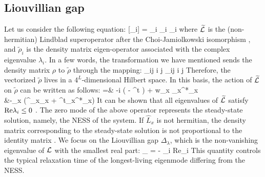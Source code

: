 \subsection{Liouvillian gap}
\label{subsec_liouvilliangap}

Let us consider the following equation:
	[\widetilde \rho_i] = \lambda_i \widetilde \rho_i \cm
	\qquad \lambda_i \in {} \pc
\ea
where $\widetilde {\cal L}$ is the (non-hermitian) Lindblad superoperator after the 
Choi-Jamiolkowski isomorphism 
\cite{BP-openquantumsystembook, VZ-2004-superoperatorvidal}, and $\widetilde \rho_i$ is the
density matrix eigen-operator associated with the complex eigenvalue $\lambda_i$.
In a few words, the transformation we have mentioned sends the density matrix $\rho$ to 
$\widetilde \rho$ through the mapping:
	\rho_{ij} \ket i \bra j  \longrightarrow  \widetilde \rho_{ij} \ket i \ket j \pt
\ee
Therefore, the vectorized $\widetilde \rho$ lives in a $4^L$-dimensional Hilbert space.
In this basis, the action of $\widetilde{\cal L}$ on 
$\widetilde \rho$ can be written as follows:
	 =& -i \big( \otimes {} 
		- \otimes {}^t \big) + 
		w\sum_{x }_{x}\otimes {}^*_{x}\\
	&-\sum_{x }\big(^{\dagger}_{x}_{x}
		\otimes{}+
			\otimes\hat{L}^t_{x}^*_{x}\big) \pt
\ea
It can be shown that all eigenvalues of $\widetilde{\cal L}$ satisfy 
$ {\rm Re}{\lambda_i } \le 0$ \cite{BP-openquantumsystembook}. The zero mode of the above 
operator represents the steady-state solution, namely, the NESS of the system. 
If $\hat L_x$ is not hermitian, the density matrix corresponding to the steady-state 
solution is not proportional to the identity matrix \cite{KS-2020-boundarydephasing}. 
We focus on the Liouvillian gap $\Delta_{\lambda}$, which is the non-vanishing eigenvalue
of ${\cal L}$ with the smallest real part:
\Delta_{\lambda} = - \max_{i} {\rm Re}{\lambda_i } \pt
\ea
This quantity controls the typical relaxation time of the longest-living 
eigenmode differing from the NESS.
